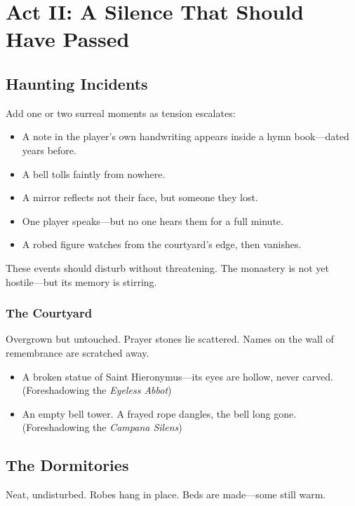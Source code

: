 \documentclass[nodeprecatedcode,bg=print]{dndbook}
\begin{document}
\newpage
\section*{Act II: A Silence That Should Have Passed}

\begin{paracol}{2}
    \subsection{Haunting Incidents}

    Add one or two surreal moments as tension escalates:
    \begin{Example}{}
    \begin{itemize}
        \item A note in the player’s own handwriting appears inside a hymn book—dated years before.
        \item A bell tolls faintly from nowhere.
        \item A mirror reflects not their face, but someone they lost.
        \item One player speaks—but no one hears them for a full minute.
        \item A robed figure watches from the courtyard's edge, then vanishes.
    \end{itemize}
    \end{Example}

    These events should disturb without threatening. The monastery is not yet hostile—but its memory is stirring.

    \subsubsection{The Courtyard}
    Overgrown but untouched. Prayer stones lie scattered. Names on the wall of remembrance are scratched away.
    
    \begin{Example}{}
        \begin{itemize}
            \item A broken statue of Saint Hieronymus—its eyes are hollow, never carved. (Foreshadowing the \emph{Eyeless Abbot})
            \item An empty bell tower. A frayed rope dangles, the bell long gone. (Foreshadowing the \emph{Campana Silens})
        \end{itemize}
    \end{Example}

    \subsection{The Dormitories}
    Neat, undisturbed. Robes hang in place. Beds are made—some still warm.


\end{paracol}
\end{document}
